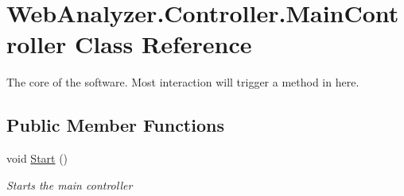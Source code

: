 \hypertarget{class_web_analyzer_1_1_controller_1_1_main_controller}{}\section{Web\+Analyzer.\+Controller.\+Main\+Controller Class Reference}
\label{class_web_analyzer_1_1_controller_1_1_main_controller}


The core of the software. Most interaction will trigger a method in here.  


\subsection*{Public Member Functions}
\begin{DoxyCompactItemize}
\item 
void \hyperlink{class_web_analyzer_1_1_controller_1_1_main_controller_aa0e998787b138f45bf60f543c774a31f}{Start} ()
\begin{DoxyCompactList}\small\item\em Starts the main controller \end{DoxyCompactList}\end{DoxyCompactItemize}
